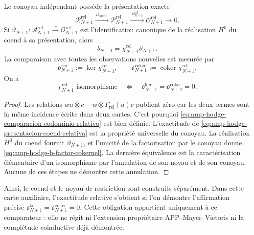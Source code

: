 \begin{lemma}
\label{lem:amp-hodge-comparacion-codominio-relativo}
Le conoyau indépendant possède la présentation exacte
\begin{equation}\label{eq:amp-hodge-presentacion-coend-relativa}
 \mathscr R_{N+1}^{\mathrm{rel}}
 \xrightarrow{\ d_{\mathrm{coend}}\ }
 \mathscr P_{N+1}^{\mathrm{rel}}
 \xrightarrow{\ \pi_{N+1}^{\mathrm{rel}}\ }
 \mathscr O_{N+1}^{\mathrm{rel}}\longrightarrow0 .
\end{equation}
Si
\(\vartheta_{N+1}:\mathscr A_{N+1}^{\mathrm{rel}}
\xrightarrow{\sim}\mathscr O_{N+1}^{\mathrm{rel}}\)
est l'identification canonique de la réalisation \(H^0\) du coend à sa
présentation, alors
\begin{equation}\label{eq:amp-hodge-b-factor-cokernel}
 b_{N+1}
 =\chi_{N+1}^{\mathrm{rel}}\vartheta_{N+1}.
\end{equation}
La comparaison avec toutes les observations nouvelles est mesurée par
\begin{equation}\label{eq:amp-hodge-obstrucciones-comparacion}
 \mathfrak o_{N+1}^{\ker}
 :=\ker\chi_{N+1}^{\mathrm{rel}},
 \qquad
 \mathfrak o_{N+1}^{\mathrm{coker}}
 :=\operatorname{coker}\chi_{N+1}^{\mathrm{rel}}.
\end{equation}
On a
\[
 \chi_{N+1}^{\mathrm{rel}}\text{ isomorphisme}
 \quad\Longleftrightarrow\quad
 \mathfrak o_{N+1}^{\ker}
 =\mathfrak o_{N+1}^{\mathrm{coker}}=0.
\]
\end{lemma}

\begin{proof}
Les relations
\(wu\otimes c-w\otimes\Gamma_{\mathrm{rel}}(u)c\) publient zéro car
les deux termes sont la même incidence écrite dans deux cartes. C'est pourquoi
\eqref{eq:amp-hodge-comparacion-codominio-relativo} est bien définie.
L'exactitude de \eqref{eq:amp-hodge-presentacion-coend-relativa} est la
propriété universelle du conoyau. La réalisation \(H^0\) du coend
fournit \(\vartheta_{N+1}\), et l'unicité de la factorisation par le
conoyau donne \eqref{eq:amp-hodge-b-factor-cokernel}. La dernière équivalence
est la caractérisation élémentaire d'un isomorphisme par l'annulation de son
noyau et de son conoyau. Aucune de ces étapes ne démontre cette annulation.
\end{proof}

Ainsi, le coend et le noyau de restriction sont construits séparément. Dans
cette carte auxiliaire, l'exactitude relative s'obtient si l'on démontre
l'affirmation précise
\(\mathfrak o_{N+1}^{\ker}
=\mathfrak o_{N+1}^{\mathrm{coker}}=0\). Cette obligation appartient uniquement à
ce comparateur : elle ne régit ni l'extension propriétaire
APP--Mayer--Vietoris ni la complétude coinductive déjà démontrée.

